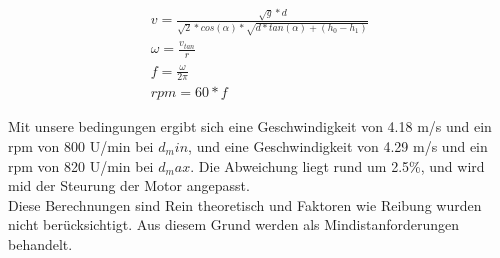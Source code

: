 \begin{gather}
	v=\frac{\sqrt{g}*d}{\sqrt{2}*cos(\alpha)*\sqrt{d*tan(\alpha)+(h_0-h_1)}}\\
	\omega=\frac{v_{tan}}{r}\\
	f=\frac{\omega}{2\pi}\\
	rpm=60*f
\end{gather}

Mit unsere bedingungen ergibt sich eine Geschwindigkeit von 4.18 m/s und ein rpm von 800 U/min bei $d_min$, 
und eine Geschwindigkeit von 4.29 m/s und ein rpm von 820 U/min bei $d_max$. 
Die Abweichung liegt rund um 2.5\%, und wird mid der Steurung der Motor angepasst. \\
Diese Berechnungen sind Rein theoretisch und Faktoren wie Reibung wurden nicht berücksichtigt. Aus diesem Grund werden als Mindistanforderungen behandelt.
